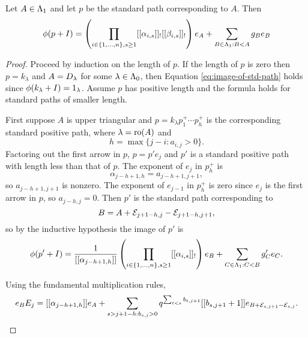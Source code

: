 \documentclass[a4paper, 11pt, twoside]{report}
\begin{document}
\begin{proposition}\label{proposition:image-of-standard-path}
Let $A\in\Lambda_1{}$ and let $p$ be the standard path corresponding to $A$. Then
\begin{equation}
\phi(p+I) = \left(\prod_{i\in\{1,\ldots,n\},s\geq 1} [[\alpha_{i,s}]]_![[\beta_{i,s}]]_!\right) e_A + \sum_{B\in\Lambda_1{}:B<A} g_Be_B \label{eq:image-of-std-path}
\end{equation}
\end{proposition}

\begin{proof}
Proceed by induction on the length of $p$. If the length of $p$ is zero then $p=k_\lambda$ and $A=D_{\lambda}$ for some $\lambda\in\Lambda_0{}$, then Equation \eqref{eq:image-of-std-path} holds since $\phi(k_\lambda +I)=1_\lambda$. Assume $p$ has positive length and the formula holds for standard paths of smaller length.

First suppose $A$ is upper triangular and $p=k_\lambda p_1^+\cdots p_h^+$ is the corresponding standard positive path, where $\lambda=\operatorname{ro}(A)$ and
\begin{equation*}
h=\max\{j-i:a_{i,j}>0\}.
\end{equation*}
Factoring out the first arrow in $p$, $p=p'e_j$ and $p'$ is a standard positive path with length less than that of $p$. The exponent of $e_j$ in $p_h^+$ is
\begin{equation*}
\alpha_{j-h+1,h}=a_{j-h+1,j+1},
\end{equation*}
so $a_{j-h+1,j+1}$ is nonzero. The exponent of $e_{j-1}$ in $p_h^+$ is zero since $e_j$ is the first arrow in $p$, so $a_{j-h,j}=0$. Then $p'$ is the standard path corresponding to
\begin{equation*}
B=A+\mathcal{E}_{j+1-h,j}-\mathcal{E}_{j+1-h,j+1},
\end{equation*}
so by the inductive hypothesis the image of $p'$ is
\begin{equation*}
\phi(p'+I) = \frac{1}{[[\alpha_{j-h+1,h}]]}\left(\prod_{i\in\{1,\ldots,n\},s\geq 1} [[\alpha_{i,s}]]_!\right) e_B + \sum_{C\in\Lambda_1{}:C<B} g_C'e_C.
\end{equation*}

Using the fundamental multiplication rules,
\begin{equation*}
e_BE_j = [[\alpha_{j-h+1,h}]]e_A + \sum_{s>j+1-h:b_{s,j}>0} q^{\sum_{t<s}b_{t,j+1}}[[b_{s,j+1}+1]]e_{B+\mathcal{E}_{s,j+1}-\mathcal{E}_{s,j}}.
\end{equation*}


\end{proof}
\end{document}
